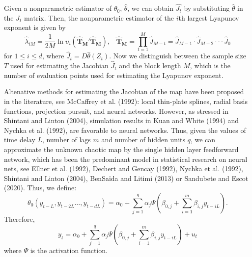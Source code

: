 \documentclass[12pt]{article}
\begin{document}
Given a nonparametric estimator
of $\theta_{0}$, $\hat{\theta}$, we can obtain $\hat{J_{t}}$ by substituting $\hat{\theta}$
in the $J_{t}$ matrix. 
Then, the nonparametric estimator of the $i$th largest
Lyapunov exponent is given by
\begin{equation}
\hat{\lambda}_{iM}=\frac{1}{2M}\ln\upsilon_i\left(\mathbf{\hat{T}_{M}'\hat{T}_{M}}\right),\,\,\,\,\,\mathbf{\hat{T}_{M}}=\prod_{t=1}^{M}\hat{J}_{M-t}=
\hat{J}_{M-1}\cdot\hat{J}_{M-2}\cdot\cdot\cdot\hat{J}_{0}
\end{equation}
for $1\leq i \leq d$, where
$\hat{J}_t=D\hat{\theta}(Z_{t})$. Now we distinguish between
the sample size $T$ used for estimating the Jacobian $\hat{J}_{t}$ and the
block length $M$, which is the number of evaluation points used for estimating
the Lyapunov exponent.




Altenative methods for estimating the Jacobian of the map have been proposed in the literature, see McCaffrey et al. (1992): local thin-plate splines, radial basis functions, projection pursuit, and neural networks. However, as stressed in Shintani and Linton (2004), simulation results in Kuan and White (1994) and Nychka et al. (1992), are favorable to neural networks.
Thus, given the values of time delay $L$, number of lags $m$ and number of hidden units $q$, we can approximate the unknown chaotic map by the single hidden layer feedforward network, which has been the predominant model in statistical research on neural nets, see Ellner et al. (1992), Dechert and Gencay (1992), Nychka et al. (1992), Shintani and Linton (2004), BenSa\"{i}da and Litimi (2013) or Sandubete and Escot (2020). Thus, we define:
\begin{equation} 
\theta_{0}(y_{t-L},y_{t-2L}\ldots,y_{t-dL})=\alpha_0+\sum_{j=1}^q\alpha_j \Psi \left(\beta_{0,j}+\sum_{i=1}^m\beta_{i,j}y_{t-iL}\right).
\end{equation}
Therefore,
\begin{equation}
y_t=\alpha_0+\sum_{j=1}^q\alpha_j \Psi \left(\beta_{0,j}+\sum_{i=1}^m\beta_{i,j}y_{t-iL}\right)+u_{t}
\end{equation}
where   $ \Psi$ is the activation function.
\end{document}
